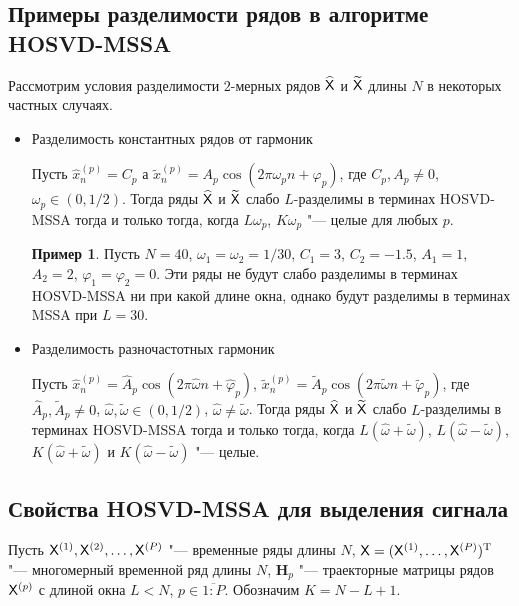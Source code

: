 \documentclass[specialist,
    substylefile = spbu.rtx,
    subf,href,colorlinks=true, 12pt]{disser}
\theoremstyle{plain}
\theoremstyle{definition}
\newtheorem{example}{Пример}[section]
\theoremstyle{remark}
\begin{document}
    
    \subsection{Примеры разделимости рядов в алгоритме HOSVD-MSSA}\label{subsec:hosvd-mssa-sep-example}
    Рассмотрим условия разделимости $2$-мерных рядов $\widehat{\mathsf{X}}$ и $\widetilde{\mathsf{X}}$ длины $N$ в некоторых
    частных случаях.
    \begin{itemize}
        \item Разделимость константных рядов от гармоник
        
        Пусть $\hat{x}_n^{(p)} = C_p$ а
        $\tilde{x}_n^{(p)} = A_p \cos(2\pi \omega_p n + \varphi_p)$,
        где $C_p, A_p \ne 0$, $\omega_p \in (0, 1/2)$.
        Тогда ряды $\widehat{\mathsf{X}}$ и $\widetilde{\mathsf{X}}$ слабо $L$-разделимы в терминах HOSVD-MSSA тогда и только тогда,
        когда $L\omega_p$, $K\omega_p$ "--- целые для любых $p$.
        \begin{example}
            \label{ex:no-sep}
            Пусть $N=40$, $\omega_1=\omega_2=1/30$, $C_1 = 3$, $C_2=-1.5$, $A_1 = 1$, $A_2 = 2$, 
            $\varphi_1 = \varphi_2 = 0$. 
            Эти ряды не будут слабо разделимы в терминах HOSVD-MSSA ни при какой длине окна, однако 
            будут разделимы в терминах MSSA при $L=30$.
        \end{example}
        
        \item Разделимость разночастотных гармоник
        
        Пусть $\hat{x}_n^{(p)} = \widehat{A}_p \cos(2 \pi \hat{\omega} n + \hat{\varphi}_p)$,
        $\tilde{x}_n^{(p)} = \widetilde{A}_p \cos(2\pi \tilde{\omega} n + \tilde{\varphi}_p)$,
        где $\widehat{A}_p, \widetilde{A}_p \ne 0$, \linebreak $\hat{\omega}, \tilde{\omega} \in (0, 1/2)$, 
        $\hat{\omega} \ne \tilde{\omega}$.
        Тогда ряды $\widehat{\mathsf{X}}$ и $\widetilde{\mathsf{X}}$ слабо $L$-разделимы в терминах HOSVD-MSSA тогда и только тогда,
        когда $L(\hat{\omega} + \tilde{\omega})$, $L(\hat{\omega} - \tilde{\omega})$, 
        $K(\hat{\omega} + \tilde{\omega})$ и $K(\hat{\omega} - \tilde{\omega})$ "--- целые.
    \end{itemize}
    
    
    \subsection{Свойства HOSVD-MSSA для выделения сигнала}\label{subsec:hosvd-mssa-signal-properties}
    Пусть $\mathsf{X}^{(1)}, \mathsf{X}^{(2)}, \ldots, \mathsf{X}^{(P)}$ "--- временные ряды длины $N$,
    $\mathsf{X} = (\mathsf{X}^{(1)},\ldots, \mathsf{X}^{(P)})^{\mathrm{T}}$ "--- многомерный временной ряд длины $N$,
    $\mathbf{H}_p$ "--- траекторные матрицы рядов $\mathsf{X}^{(p)}$ с длиной окна $L < N$, $p\in \overline{1:P}$.
    Обозначим $K = N - L + 1$.
\end{document}
